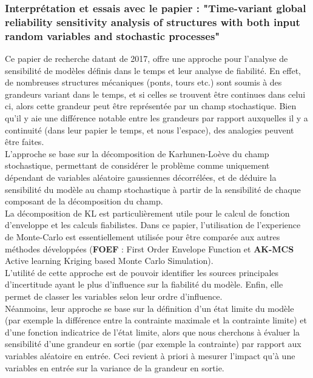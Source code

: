 \documentclass[a4paper,10pt]{article}
\begin{document}
\subsubsection{Interprétation et essais avec le papier : "Time-variant global reliability sensitivity analysis of structures with both input random variables and stochastic processes"}
Ce papier de recherche datant de 2017, offre une approche pour l'analyse de sensibilité de modèles définis dans le temps et leur analyse de fiabilité. En effet, de nombreuses structures mécaniques (ponts, tours etc.) sont soumis à des grandeurs variant dans le temps, et si celles se trouvent être continues dans celui ci, alors cette grandeur peut être représentée par un champ stochastique. Bien qu'il y aie une différence notable entre les grandeurs par rapport auxquelles il y a continuité (dans leur papier le temps, et nous l'espace), des analogies peuvent être faites. \\

L'approche se base sur la décomposition de Karhunen-Loève du champ stochastique, permettant de considérer le problème comme uniquement dépendant de variables aléatoire gaussiennes décorrélées, et de déduire la sensibilité du modèle au champ stochastique à partir de la sensibilité de chaque composant de la décomposition du champ. \\ 

La décomposition de KL est particulièrement utile pour le calcul de fonction d'enveloppe et les calculs fiabilistes. Dans ce papier, l'utilisation de l'experience de Monte-Carlo est essentiellement utilisée pour être comparée aux autres méthodes développées (\textbf{FOEF} : First Order Envelope Function et \textbf{AK-MCS} Active learning Kriging based Monte Carlo Simulation).\\

L'utilité de cette approche est de pouvoir identifier les sources principales d'incertitude ayant le plus d'influence sur la fiabilité du modèle. Enfin, elle permet de classer les variables selon leur ordre d'influence. \\

Néanmoins, leur approche se base sur la définition d'un état limite du modèle (par exemple la différence entre la contrainte maximale et la contrainte limite) et d'une fonction indicatrice de l'état limite, alors que nous cherchons à évaluer la sensibilité d'une grandeur en sortie (par exemple la contrainte) par rapport aux variables aléatoire en entrée. Ceci revient à priori à mesurer l'impact qu'à une variables en entrée sur la variance de la grandeur en sortie. \\
\end{document}
